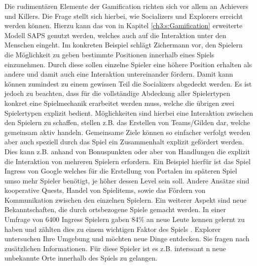 Die rudimentären Elemente der Gamification richten sich vor allem an Achievers und Killers.
Die Frage stellt sich hierbei, wie Socializers und Explorers erreicht werden können.
Hierzu kann das von \cite{Zichermann.2011} in Kapitel \ref{ch3:s:Gamification} erweiterte Modell SAPS genutzt werden, welches auch auf die Interaktion unter den Menschen eingeht. Im konkreten Beispiel schlägt Zichermann vor, den Spielern die Möglichkeit zu geben bestimmte Positionen innerhalb eines Spiels einzunehmen. Durch diese sollen einzelne Spieler eine höhere Position erhalten als andere und damit auch eine Interaktion untereinander fördern. Damit kann können zumindest zu einem gewissen Teil die Socializers abgedeckt werden.
Es ist jedoch zu beachten, dass für die vollständige Abdeckung aller Spielertypen konkret eine Spielmechanik erarbeitet werden muss, welche die übrigen zwei Spielertypen explizit bedient. Möglichkeiten sind hierbei eine Interaktion zwischen den Spielern zu schaffen, stellen z.B. das Erstellen von Teams/Gilden dar, welche gemeinsam aktiv handeln. Gemeinsame Ziele können so einfacher verfolgt werden aber auch speziell durch das Spiel ein Zusammenhalt explizit gefördert werden. Dies kann z.B. anhand von Bonuspunkten oder aber von Handlungen die explizit die Interaktion von mehreren Spielern erfordern. Ein Beispiel hierfür ist das Spiel Ingress von Google welches für die Erstellung von Portalen im späteren Spiel umso mehr Spieler benötigt, je höher dessen Level sein soll. \cite{Celino.2013}
Andere Ansätze sind kooperative Quests, Handel von Spielitems, sowie das Fördern von Kommunikation zwischen den einzelnen Spielern. \cite{Caon.2013} Ein weiterer Aspekt sind neue Bekanntschaften, die durch ortsbezogene Spiele gemacht werden. In einer Umfrage von 6400 Ingress Spielern gaben 84\% an neue Leute kennen gelernt zu haben und zählten dies zu einem wichtigen Faktor des Spiels \cite{Ingress.2014}.
Explorer untersuchen Ihre Umgebung und möchten neue Dinge entdecken. Sie fragen nach zusätzlichen Informationen. Für diese Spieler ist es z.B. interssant n neue unbekannte Orte innerhalb des Spiels zu gelangen.

